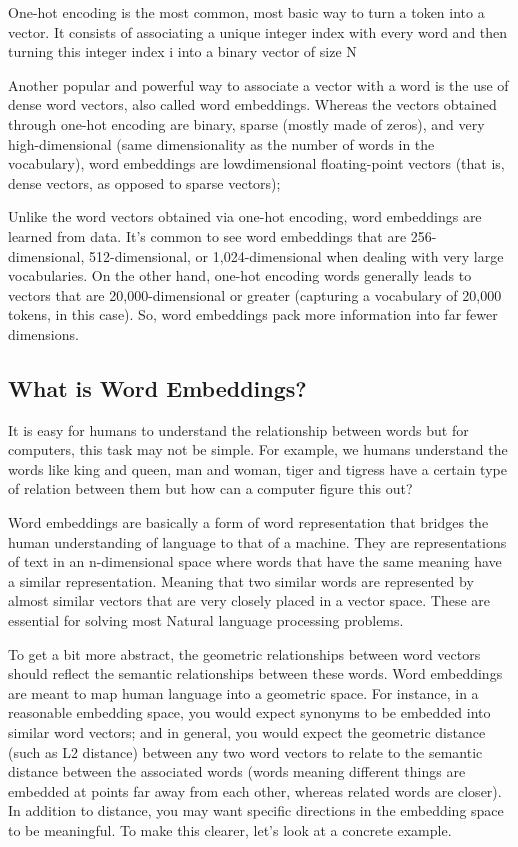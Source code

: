 \documentclass[11pt]{article}
\begin{document}
    One-hot encoding is the most common, most basic way to turn a token into
a vector. It consists of associating a unique integer index with every
word and then turning this integer index i into a binary vector of size
N

    Another popular and powerful way to associate a vector with a word is
the use of dense word vectors, also called word embeddings. Whereas the
vectors obtained through one-hot encoding are binary, sparse (mostly
made of zeros), and very high-dimensional (same dimensionality as the
number of words in the vocabulary), word embeddings are lowdimensional
floating-point vectors (that is, dense vectors, as opposed to sparse
vectors);

    Unlike the word vectors obtained via one-hot encoding, word embeddings
are learned from data. It's common to see word embeddings that are
256-dimensional, 512-dimensional, or 1,024-dimensional when dealing with
very large vocabularies. On the other hand, one-hot encoding words
generally leads to vectors that are 20,000-dimensional or greater
(capturing a vocabulary of 20,000 tokens, in this case). So, word
embeddings pack more information into far fewer dimensions.

    \hypertarget{what-is-word-embeddings}{%
\subsection{What is Word Embeddings?}\label{what-is-word-embeddings}}

    It is easy for humans to understand the relationship between words but
for computers, this task may not be simple. For example, we humans
understand the words like king and queen, man and woman, tiger and
tigress have a certain type of relation between them but how can a
computer figure this out?

Word embeddings are basically a form of word representation that bridges
the human understanding of language to that of a machine. They are
representations of text in an n-dimensional space where words that have
the same meaning have a similar representation. Meaning that two similar
words are represented by almost similar vectors that are very closely
placed in a vector space. These are essential for solving most Natural
language processing problems.

To get a bit more abstract, the geometric relationships between word
vectors should reflect the semantic relationships between these words.
Word embeddings are meant to map human language into a geometric space.
For instance, in a reasonable embedding space, you would expect synonyms
to be embedded into similar word vectors; and in general, you would
expect the geometric distance (such as L2 distance) between any two word
vectors to relate to the semantic distance between the associated words
(words meaning different things are embedded at points far away from
each other, whereas related words are closer). In addition to distance,
you may want specific directions in the embedding space to be
meaningful. To make this clearer, let's look at a concrete example.
\end{document}
